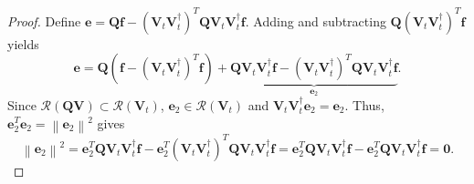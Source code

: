 \documentclass[preprint,10pt]{elsarticle}
\theoremstyle{definition}
\theoremstyle{lemma}
\theoremstyle{theorem}
\theoremstyle{assumption}
\newcommand{\diag}[1]{{\rm diag}\LRp{#1}}
\newcommand{\nor}[1]{\left\| #1 \right\|}
\newcommand{\LRp}[1]{\left( #1 \right)}
\begin{document}
\begin{proof}
Define $\bm{e} = \bm{Q}\bm{f} - \LRp{\bm{V}_t\bm{V}_t^{\dagger}}^T\bm{Q}\bm{V}_t\bm{V}_t^{\dagger}\bm{f}$.  Adding and subtracting $\bm{Q}\LRp{\bm{V}_t\bm{V}_t^{\dagger}}^T\bm{f}$ yields
\[
\bm{e} = \bm{Q}\LRp{\bm{f} - \LRp{\bm{V}_t\bm{V}_t^{\dagger}}^T\bm{f}} + \underbrace{\bm{Q}{\bm{V}_t\bm{V}_t^{\dagger}}\bm{f} - \LRp{\bm{V}_t\bm{V}_t^{\dagger}}^T\bm{Q}\bm{V}_t\bm{V}_t^{\dagger}\bm{f}}_{\bm{e}_2}.
\]
Since $\mathcal{R}\LRp{\bm{Q}\bm{V}} \subset \mathcal{R}\LRp{\bm{V}_t}$, $\bm{e}_2\in \mathcal{R}\LRp{\bm{V}_t}$ and $\bm{V}_t\bm{V}_t^\dagger\bm{e}_2 = \bm{e}_2$.  Thus, $\bm{e}_2^T\bm{e}_2 = \nor{\bm{e}_2}^2$ gives
\[
\nor{\bm{e}_2}^2 = \bm{e}_2^T\bm{Q}{\bm{V}_t\bm{V}_t^{\dagger}}\bm{f} - \bm{e}_2^T\LRp{\bm{V}_t\bm{V}_t^{\dagger}}^T\bm{Q}\bm{V}_t\bm{V}_t^{\dagger}\bm{f} 
= \bm{e}_2^T\bm{Q}{\bm{V}_t\bm{V}_t^{\dagger}}\bm{f} - \bm{e}_2^T\bm{Q}\bm{V}_t\bm{V}_t^{\dagger}\bm{f} = \bm{0}.
\]
 \end{proof}
\end{document}

